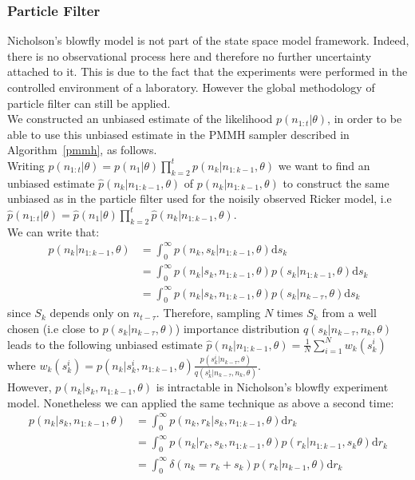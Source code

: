 \documentclass[12pt]{article}
\begin{document}
	\subsubsection{Particle Filter}
	Nicholson's blowfly model is not part of the state space model framework. Indeed, there is no observational process here and therefore no further uncertainty attached to it. This is due to the fact that the experiments were performed in the controlled environment of a laboratory. However the global methodology of particle filter can still be applied. \\
	We constructed an unbiased estimate of the likelihood $p(n_{1:t}|\theta)$, in order to be able to use this unbiased estimate in the PMMH sampler described in Algorithm~\ref{pmmh}, as follows. \\
	Writing $p(n_{1:t}|\theta) = p(n_1|\theta)\prod_{k=2}^{t}p(n_k|n_{1:k-1}, \theta)$ we want to find an unbiased estimate $\hat{p}(n_k|n_{1:k-1}, \theta)$ of $p(n_k|n_{1:k-1}, \theta)$ to construct the same unbiased as in the particle filter used for the noisily observed Ricker model, i.e $\hat{p}(n_{1:t}|\theta)=\hat{p}(n_1|\theta)\prod_{k=2}^{t}\hat{p}(n_k|n_{1:k-1}, \theta)$. \\
	We can write that:
	\begin{align*}
	p(n_k|n_{1:k-1}, \theta) & = \int_{0}^{\infty}p(n_k, s_k |n_{1:k-1}, \theta)\mathrm{d}s_k \\
	& = \int_{0}^{\infty}p(n_k |s_k, n_{1:k-1}, \theta)p(s_k|n_{1:k-1}, \theta)\mathrm{d}s_k \\
	& = \int_{0}^{\infty}p(n_k |s_k, n_{1:k-1}, \theta)p(s_k|n_{k-\tau}, \theta)\mathrm{d}s_k
	\end{align*}
	since $S_k$ depends only on $n_{t-\tau}$.
	Therefore, sampling $N$ times $S_k$ from a well chosen (i.e close to $p(s_k|n_{k-\tau}, \theta)$) importance distribution $q(s_k|n_{k-\tau}, n_k, \theta)$ leads to the following unbiased estimate $\hat{p}(n_k|n_{1:k-1}, \theta) = \frac{1}{N}\sum_{i=1}^{N}w_k(s_k^i)$ where $w_k(s_k^i) =p(n_k |s_k^i, n_{1:k-1}, \theta)\frac{p(s_k^i|n_{k-\tau}, \theta)}{q(s_k^i|n_{k-\tau}, n_k, \theta)}$. \\
	However, $p(n_k |s_k, n_{1:k-1}, \theta)$ is intractable in Nicholson's blowfly experiment model. Nonetheless we can applied the same technique as above a second time:
	\begin{align*}
	p(n_k |s_k, n_{1:k-1}, \theta) & = \int_{0}^{\infty}p(n_k, r_k|s_k, n_{1:k-1}, \theta)\mathrm{d}r_k \\
	& = \int_{0}^{\infty}p(n_k| r_k, s_k, n_{1:k-1}, \theta)p( r_k|n_{1:k-1}, s_k \theta)\mathrm{d}r_k \\
	& = \int_{0}^{\infty}\delta(n_k = r_k + s_k)p(r_k|n_{k-1}, \theta)\mathrm{d}r_k
	\end{align*}
\end{document}
